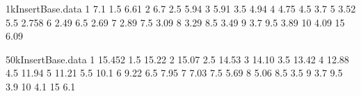 

\begin{filecontents}{1kInsertBase.data}
1 7.1
1.5 6.61
2 6.7
2.5 5.94
3 5.91
3.5 4.94
4 4.75
4.5 3.7
5 3.52
5.5 2.758
6 2.49
6.5 2.69
7 2.89
7.5 3.09
8 3.29
8.5 3.49
9 3.7
9.5 3.89
10 4.09
15 6.09
\end{filecontents}


\begin{filecontents}{50kInsertBase.data}
1 15.452
1.5 15.22
2 15.07
2.5 14.53
3 14.10
3.5 13.42
4 12.88
4.5 11.94
5 11.21
5.5 10.1
6 9.22
6.5 7.95
7 7.03
7.5 5.69
8 5.06
8.5 3.5
9 3.7
9.5 3.9
10 4.1
15 6.1
\end{filecontents}
